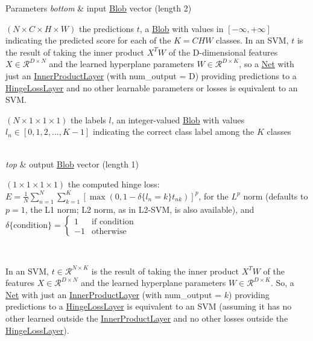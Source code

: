 \begin{DoxyParams}{Parameters}
{\em bottom} & input \hyperlink{classcaffe_1_1Blob}{Blob} vector (length 2)
\begin{DoxyEnumerate}
\item $ (N \times C \times H \times W) $ the predictions $ t $, a \hyperlink{classcaffe_1_1Blob}{Blob} with values in $ [-\infty, +\infty] $ indicating the predicted score for each of the $ K = CHW $ classes. In an S\+VM, $ t $ is the result of taking the inner product $ X^T W $ of the D-\/dimensional features $ X \in \mathcal{R}^{D \times N} $ and the learned hyperplane parameters $ W \in \mathcal{R}^{D \times K} $, so a \hyperlink{classcaffe_1_1Net}{Net} with just an \hyperlink{classcaffe_1_1InnerProductLayer}{Inner\+Product\+Layer} (with num\+\_\+output = D) providing predictions to a \hyperlink{classcaffe_1_1HingeLossLayer}{Hinge\+Loss\+Layer} and no other learnable parameters or losses is equivalent to an S\+VM.
\item $ (N \times 1 \times 1 \times 1) $ the labels $ l $, an integer-\/valued \hyperlink{classcaffe_1_1Blob}{Blob} with values $ l_n \in [0, 1, 2, ..., K - 1] $ indicating the correct class label among the $ K $ classes 
\end{DoxyEnumerate}\\
\hline
{\em top} & output \hyperlink{classcaffe_1_1Blob}{Blob} vector (length 1)
\begin{DoxyEnumerate}
\item $ (1 \times 1 \times 1 \times 1) $ the computed hinge loss\+: $ E = \frac{1}{N} \sum\limits_{n=1}^N \sum\limits_{k=1}^K [\max(0, 1 - \delta\{l_n = k\} t_{nk})] ^ p $, for the $ L^p $ norm (defaults to $ p = 1 $, the L1 norm; L2 norm, as in L2-\/\+S\+VM, is also available), and $ \delta\{\mathrm{condition}\} = \left\{ \begin{array}{lr} 1 & \mbox{if condition} \\ -1 & \mbox{otherwise} \end{array} \right. $
\end{DoxyEnumerate}\\
\hline
\end{DoxyParams}
In an S\+VM, $ t \in \mathcal{R}^{N \times K} $ is the result of taking the inner product $ X^T W $ of the features $ X \in \mathcal{R}^{D \times N} $ and the learned hyperplane parameters $ W \in \mathcal{R}^{D \times K} $. So, a \hyperlink{classcaffe_1_1Net}{Net} with just an \hyperlink{classcaffe_1_1InnerProductLayer}{Inner\+Product\+Layer} (with num\+\_\+output = $k$) providing predictions to a \hyperlink{classcaffe_1_1HingeLossLayer}{Hinge\+Loss\+Layer} is equivalent to an S\+VM (assuming it has no other learned outside the \hyperlink{classcaffe_1_1InnerProductLayer}{Inner\+Product\+Layer} and no other losses outside the \hyperlink{classcaffe_1_1HingeLossLayer}{Hinge\+Loss\+Layer}). 

